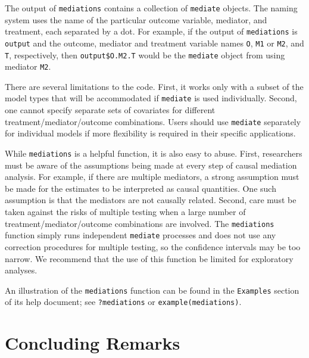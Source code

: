 \documentclass[11pt,letterpaper]{article}
\theoremstyle{plain}
\begin{document}
The output of {\tt mediations} contains a collection of {\tt mediate} objects. The naming
system uses the name of the particular outcome variable, mediator, and
treatment, each separated by a dot. For example, if the output of {\tt mediations}
is {\tt output} and the outcome, mediator and treatment variable names
{\tt O}, {\tt M1} or {\tt M2}, and {\tt T}, respectively, 
then {\tt output\$O.M2.T} would be the {\tt mediate} object from using mediator
{\tt M2}.

There are several limitations to the code. First, it works only with a subset of
the model types that will be accommodated if {\tt mediate} is used individually.
Second, one cannot specify separate sets of covariates for different
treatment/mediator/outcome combinations. Users should use {\tt mediate} separately
for individual models if more flexibility is required in their specific
applications. 

While {\tt mediations} is a helpful function, it is also easy to abuse. 
First, researchers must be aware of the assumptions being made at every step of
causal mediation analysis. For example, if there are multiple mediators, a
strong assumption must be made for the estimates to be interpreted as causal
quantities. One such assumption is that the mediators are not causally related. 
Second, care must be taken against the risks of multiple testing when a 
large number of treatment/mediator/outcome combinations are involved.  The
{\tt mediations} function simply runs independent {\tt mediate} processes and
does not use any correction procedures for multiple testing, so the confidence
intervals may be too narrow. We recommend that the use of this function be limited
for exploratory analyses.

An illustration of the {\tt mediations} function can be found in the {\tt Examples}
section of its help document; see {\tt ?mediations} or {\tt example(mediations)}.

\section{Concluding Remarks}
\end{document}
